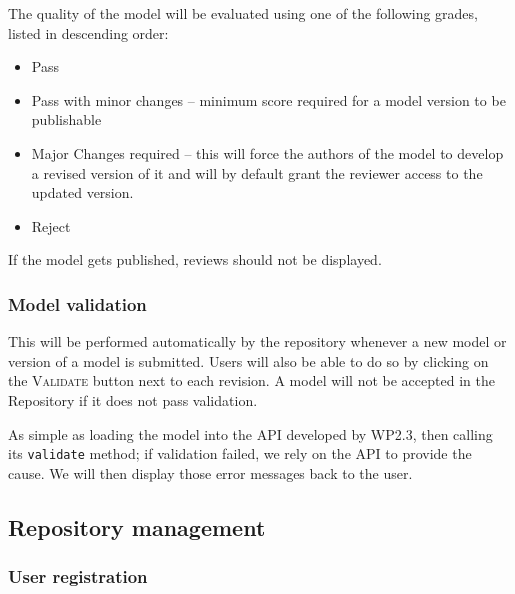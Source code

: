 \begin{techNote}
The quality of the model will be evaluated using one of the following grades, listed in descending order:
\begin{itemize}
\item Pass
\item Pass with minor changes -- minimum score required for a model version to be publishable
\item Major Changes required -- this will force the authors of the model to develop a revised version of it and will by default grant the reviewer access to the updated version. 
\item Reject
\end{itemize}
If the model gets published, reviews should not be displayed. 
\end{techNote}


\subsubsection{Model validation}
This will be performed automatically by the repository whenever a new model or version of a model is submitted. Users will also be able to do so by clicking on the \textsc{Validate} button next to each revision. A model will not be accepted in the Repository if it does not pass validation. 


\begin{techNote}
As simple as loading the model into the API developed by WP2.3, then calling its \texttt{validate} method; if validation failed, we rely on the API to provide the cause. We will then display those error messages back to the user.
\end{techNote}

\subsection{Repository management} 

\subsubsection{User registration}


